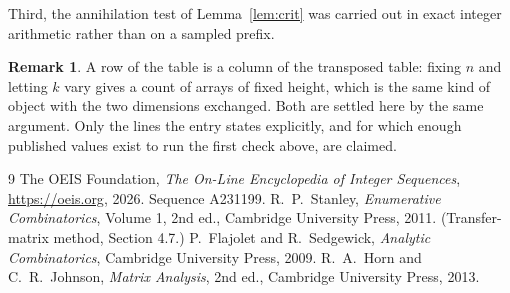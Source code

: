 \documentclass[11pt,a4paper]{article}
\theoremstyle{plain}
\theoremstyle{definition}
\newtheorem{remark}[theorem]{Remark}
\begin{document}
Third, the annihilation test of Lemma~\ref{lem:crit} was carried out in exact integer
arithmetic rather than on a sampled prefix.

\begin{remark}
A row of the table is a column of the transposed table: fixing $n$ and letting $k$ vary gives a
count of arrays of fixed height, which is the same kind of object with the two dimensions
exchanged. Both are settled here by the same argument. Only the lines the entry states
explicitly, and for which enough published values exist to run the first check above, are
claimed.
\end{remark}

\begin{thebibliography}{9}
 The OEIS Foundation, \emph{The On-Line Encyclopedia of Integer
Sequences}, \url{https://oeis.org}, 2026. Sequence A231199.
 R.~P.~Stanley, \emph{Enumerative Combinatorics}, Volume 1, 2nd ed.,
Cambridge University Press, 2011. (Transfer-matrix method, Section 4.7.)
 P.~Flajolet and R.~Sedgewick, \emph{Analytic Combinatorics}, Cambridge
University Press, 2009.
 R.~A.~Horn and C.~R.~Johnson, \emph{Matrix Analysis}, 2nd ed., Cambridge
University Press, 2013.
\end{thebibliography}
\end{document}

